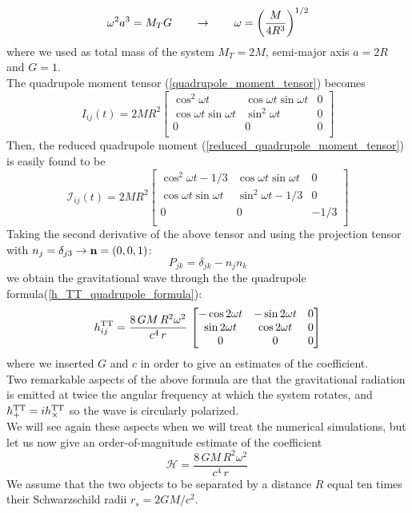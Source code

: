 \[
\omega ^{2} 
a^{3} = M_T G 
\qquad
\rightarrow
\qquad 
\omega = \qty(\dfrac{M}{4R^{3}})^{1/2}
\]
where we used as total mass of the system $M_T = 2M$, semi-major axis $a=2R$ and $G=1$.\\
The quadrupole moment tensor (\ref{quadrupole_moment_tensor}) becomes
\[
I_{ij}(t) =
2 M R^{2}
\begin{bmatrix}
 \cos ^{2} \omega t  &
 \cos \omega t \sin \omega t &
0
\\
 \cos \omega t \sin \omega t &
 \sin ^{2} \omega t &
0
\\
0 & 0 & 0\\
\end{bmatrix} 
\]
Then, the reduced quadrupole moment (\ref{reduced_quadrupole_moment_tensor}) is easily found to be
\[
\mathcal{I} _{ij}(t) =
2 M R^{2}
\begin{bmatrix}
 \cos ^{2} \omega t -1/3  &
 \cos \omega t \sin \omega t &
0
\\
 \cos \omega t \sin \omega t &
 \sin ^{2} \omega t -1/3&
0
\\
0 & 0 & -1/3\\
\end{bmatrix} 
\]
Taking the second derivative of the above tensor and using the projection tensor with $n_{j} =\delta_{j3} \rightarrow \vb{n} = (0,0,1)$:
\[
P_{jk} = \delta_{jk}- n_{j} n_{k}
\]
we obtain the gravitational wave through the the quadrupole formula(\ref{h_TT_quadrupole_formula}):
\[
h^{\text{TT}} _{ij} = \dfrac{8\,G M \,R^{2} \omega^{2}}{c^{4}\, r} \,
\begin{bmatrix}
- \cos 2 \omega t   &
 - \sin 2 \omega t &
0
\\
  \sin 2 \omega t &
 \cos 2 \omega t &
0
\\
0 & 0 & 0\\
\end{bmatrix}
\]
where we inserted $G$ and $c$ in order to give an estimates of the coefficient.\\
Two remarkable aspects of the above formula are that the gravitational radiation is emitted at  twice the angular frequency at which the system rotates, and $h_{+} ^{\text{TT}}= i h_{\times} ^{\text{TT}}$ so the wave is circularly polarized.\\
We will see again these aspects when we will treat the numerical simulations, but let us now give an order-of-magnitude estimate of the coefficient
\[
\mathcal{H} = 
 \dfrac{8\,G M \,R^{2} \omega^{2}}{c^{4}\, r} \,
\]
We assume that the two objects to be separated by a distance $R$ equal ten times their Schwarzschild radii $r_s=2 G M/c^{2}$.
